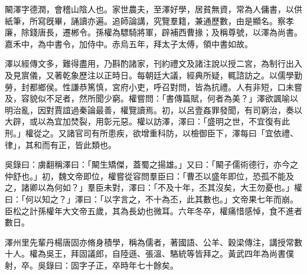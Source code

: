 
\begin{pinyinscope}
闞澤字德潤，會稽山陰人也。家世農夫，至澤好學，居貧無資，常為人傭書，以供紙筆，所寫旣畢，誦讀亦遍。追師論講，究覽羣籍，兼通歷數，由是顯名。察孝廉，除錢唐長，遷郴令。孫權為驃騎將軍，辟補西曹掾；及稱尊號，以澤為尚書。嘉禾中，為中書令，加侍中。赤烏五年，拜太子太傅，領中書如故。

澤以經傳文多，難得盡用，乃斟酌諸家，刊約禮文及諸注說以授二宮，為制行出入及見賔儀，又著乾象歷注以正時日。每朝廷大議，經典所疑，輒諮訪之。以儒學勤勞，封都鄉侯。性謙恭篤慎，宮府小吏，呼召對問，皆為抗禮。人有非短，口未嘗及，容貌似不足者，然所聞少窮。權嘗問：「書傳篇賦，何者為美？」澤欲諷喻以明治亂，因對賈誼過秦論最善，權覽讀焉。初，以呂壹姦罪發聞，有司窮治，奏以大辟，或以為宜加焚裂，用彰元惡。權以訪澤，澤曰：「盛明之世，不宜復有此刑。」權從之。又諸官司有所患疾，欲增重科防，以檢御臣下，澤每曰「宜依禮、律」，其和而有正，皆此類也。

吳錄曰：虜翻稱澤曰：「闞生矯傑，蓋蜀之揚雄。」又曰：「闞子儒術德行，亦今之仲舒也。」初，魏文帝即位，權嘗從容問羣臣曰：「曹丕以盛年即位，恐孤不能及之，諸卿以為何如？」羣臣未對，澤曰：「不及十年，丕其沒矣，大王勿憂也。」權曰：「何以知之？」澤曰：「以字言之，不十為丕，此其數也。」文帝果七年而崩。臣松之計孫權年大文帝五歲，其為長幼也微耳。六年冬卒，權痛惜感悼，食不進者數日。

澤州里先輩丹楊唐固亦脩身積學，稱為儒者，著國語、公羊、穀梁傳注，講授常數十人。權為吳王，拜固議郎，自陸遜、張溫、駱統等皆拜之。黃武四年為尚書僕射，卒。吳錄曰：固字子正，卒時年七十餘矣。


\end{pinyinscope}